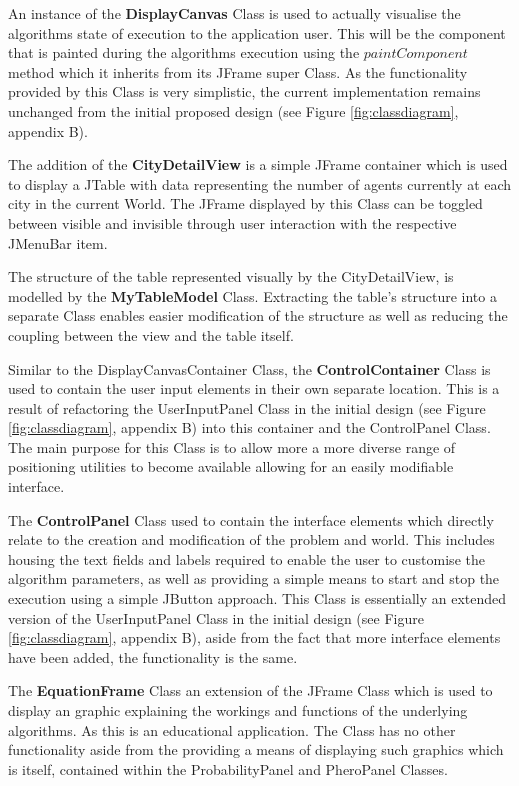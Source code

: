 An instance of the \textbf{DisplayCanvas} Class is used to actually visualise the algorithms state of execution to the application user. This will be the component that is painted during the algorithms execution using the $paintComponent$ method which it inherits from its JFrame super Class. As the functionality provided by this Class is very simplistic, the current implementation remains unchanged from the initial proposed design (see Figure \ref{fig:classdiagram}, appendix B).

The addition of the \textbf{CityDetailView} is a simple JFrame container which is used to display a JTable with data representing the number of agents currently at each city in the current World. The JFrame displayed by this Class can be toggled between visible and invisible through user interaction with the respective JMenuBar item.

The structure of the table represented visually by the CityDetailView, is modelled by the \textbf{MyTableModel} Class. Extracting the table’s structure into a separate Class enables easier modification of the structure as well as reducing the coupling between the view and the table itself.

Similar to the DisplayCanvasContainer Class, the \textbf{ControlContainer} Class is used to contain the user input elements in their own separate location. This is a result of refactoring the UserInputPanel Class in the initial design (see Figure \ref{fig:classdiagram}, appendix B) into this container and the ControlPanel Class. The main purpose for this Class is to allow more a more diverse range of positioning utilities to become available allowing for an easily modifiable interface.

The \textbf{ControlPanel} Class used to contain the interface elements which directly relate to the creation and modification of the problem and world. This includes housing the text fields and labels required to enable the user to customise the algorithm parameters, as well as providing a simple means to start and stop the execution using a simple JButton approach. This Class is essentially an extended version of the UserInputPanel Class in the initial design (see Figure \ref{fig:classdiagram}, appendix B), aside from the fact that more interface elements have been added, the functionality is the same.

The \textbf{EquationFrame} Class an extension of the JFrame Class which is used to display an graphic explaining the workings and functions of the underlying algorithms. As this is an educational application. The Class has no other functionality aside from the providing a means of displaying such graphics which is itself, contained within the ProbabilityPanel and PheroPanel Classes.

